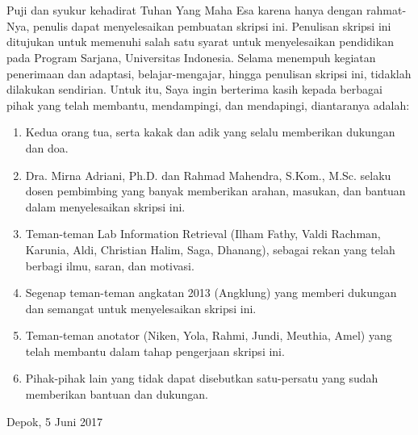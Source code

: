 \chapter*{\kataPengantar}
Puji dan syukur kehadirat Tuhan Yang Maha Esa karena hanya dengan rahmat-Nya, penulis dapat menyelesaikan pembuatan skripsi ini. Penulisan skripsi ini ditujukan untuk memenuhi salah satu syarat untuk menyelesaikan pendidikan pada Program Sarjana, Universitas Indonesia. Selama menempuh kegiatan penerimaan dan adaptasi, belajar-mengajar, hingga penulisan skripsi ini, tidaklah dilakukan sendirian. Untuk itu, Saya ingin berterima kasih kepada berbagai pihak yang telah membantu, mendampingi, dan mendapingi, diantaranya adalah:

\begin{enumerate}
  \item Kedua orang tua, serta kakak dan adik yang selalu memberikan dukungan dan doa.
  \item Dra. Mirna Adriani, Ph.D. dan Rahmad Mahendra, S.Kom., M.Sc. selaku dosen pembimbing yang banyak memberikan arahan, masukan, dan bantuan dalam menyelesaikan skripsi ini.
  \item Teman-teman Lab Information Retrieval (Ilham Fathy, Valdi Rachman, Karunia, Aldi, Christian Halim, Saga, Dhanang), sebagai rekan yang telah berbagi ilmu, saran, dan motivasi.
  \item Segenap teman-teman angkatan 2013 (Angklung) yang memberi dukungan dan semangat untuk menyelesaikan skripsi ini.
  \item Teman-teman anotator (Niken, Yola, Rahmi, Jundi, Meuthia, Amel) yang telah membantu dalam tahap pengerjaan skripsi ini.
  \item Pihak-pihak lain yang tidak dapat disebutkan satu-persatu yang sudah memberikan bantuan dan dukungan.
\end{enumerate}

\vspace*{0.1cm}
\begin{flushright}
Depok, 5 Juni 2017\\[0.1cm]
\vspace*{1cm}
\penulis

\end{flushright}
